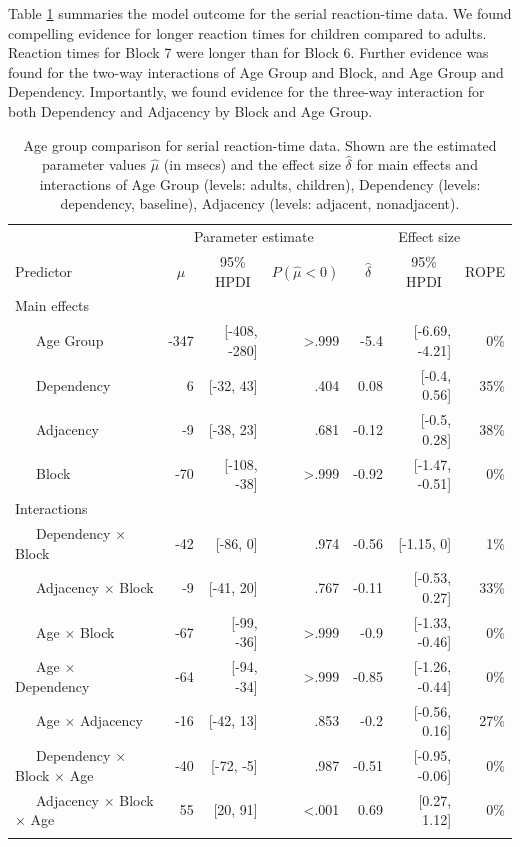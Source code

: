 \documentclass[
  english,
  man,floatsintext]{apa7}
\begin{document}
Table \ref{tab:tablemodel} summaries the model outcome for the serial reaction-time data. We found compelling evidence for longer reaction times for children compared to adults. Reaction times for Block 7 were longer than for Block 6. Further evidence was found for the two-way interactions of Age Group and Block, and Age Group and Dependency. Importantly, we found evidence for the three-way interaction for both Dependency and Adjacency by Block and Age Group.

\begin{table}[ht]

\begin{center}
\begin{threeparttable}

\caption{\label{tab:tablemodel}Age group comparison for serial reaction-time data. Shown are the estimated parameter values $\hat{\mu}$ (in msecs) and the effect size $\hat{\delta}$ for main effects and interactions of Age Group (levels: adults, children), Dependency (levels: dependency, baseline), Adjacency (levels: adjacent, nonadjacent).}

\begin{tabular}{lrrrrrr}
\toprule
 & \multicolumn{3}{c}{Parameter estimate} & \multicolumn{3}{c}{Effect size} \\
\cmidrule(r){2-4} \cmidrule(r){5-7}
Predictor & \multicolumn{1}{c}{$\hat{\mu}$} & \multicolumn{1}{c}{95\% HPDI} & \multicolumn{1}{c}{$P(\hat{\mu}<0)$} & \multicolumn{1}{c}{$\hat{\delta}$} & \multicolumn{1}{c}{95\% HPDI} & \multicolumn{1}{c}{ROPE}\\
\midrule
Main effects &  &  &  &  &  & \\
\ \ \ Age Group & -347 & [-408, -280] & >.999 & -5.4 & [-6.69, -4.21] & 0\%\\
\ \ \ Dependency & 6 & [-32, 43] & .404 & 0.08 & [-0.4, 0.56] & 35\%\\
\ \ \ Adjacency & -9 & [-38, 23] & .681 & -0.12 & [-0.5, 0.28] & 38\%\\
\ \ \ Block & -70 & [-108, -38] & >.999 & -0.92 & [-1.47, -0.51] & 0\%\\
Interactions &  &  &  &  &  & \\
\ \ \ Dependency $\times$ Block & -42 & [-86, 0] & .974 & -0.56 & [-1.15, 0] & 1\%\\
\ \ \ Adjacency $\times$ Block & -9 & [-41, 20] & .767 & -0.11 & [-0.53, 0.27] & 33\%\\
\ \ \ Age $\times$ Block & -67 & [-99, -36] & >.999 & -0.9 & [-1.33, -0.46] & 0\%\\
\ \ \ Age $\times$ Dependency & -64 & [-94, -34] & >.999 & -0.85 & [-1.26, -0.44] & 0\%\\
\ \ \ Age $\times$ Adjacency & -16 & [-42, 13] & .853 & -0.2 & [-0.56, 0.16] & 27\%\\
\ \ \ Dependency $\times$ Block $\times$ Age & -40 & [-72, -5] & .987 & -0.51 & [-0.95, -0.06] & 0\%\\
\ \ \ Adjacency $\times$ Block $\times$ Age & 55 & [20, 91] & <.001 & 0.69 & [0.27, 1.12] & 0\%\\
\bottomrule
\addlinespace
\end{tabular}


\end{threeparttable}
\end{center}
\end{table}
\end{document}
